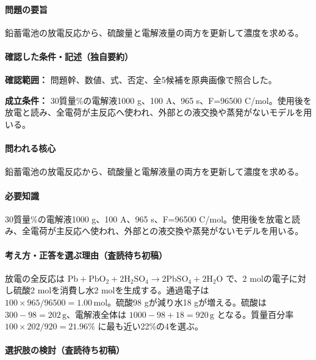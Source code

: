 \paragraph{問題の要旨} 鉛蓄電池の放電反応から、硫酸量と電解液量の両方を更新して濃度を求める。

\paragraph{確認した条件・記述（独自要約）}\mbox{}\par

\noindent\textbf{確認範囲：} 問題幹、数値、式、否定、全5候補を原典画像で照合した。\par

\noindent\textbf{成立条件：} 30質量\%の電解液1000 g、100 A、965 s、F=\allowbreak{}96500 C/mol。使用後を放電と読み、全電荷が主反応へ使われ、外部との液交換や蒸発がないモデルを用いる。\par

\paragraph{問われる核心} 鉛蓄電池の放電反応から、硫酸量と電解液量の両方を更新して濃度を求める。

\paragraph{必要知識} 30質量\%の電解液1000 g、100 A、965 s、F=\allowbreak{}96500 C/mol。使用後を放電と読み、全電荷が主反応へ使われ、外部との液交換や蒸発がないモデルを用いる。

\paragraph{考え方・正答を選ぶ理由（査読待ち初稿）} 放電の全反応は \(\mathrm{Pb+PbO_2+2H_2SO_4\to2PbSO_4+2H_2O}\) で、2 molの電子に対し硫酸2 molを消費し水2 molを生成する。通過電子は \(100\times965/96500=1.00\,\mathrm{mol}\)。硫酸98 gが減り水18 gが増える。硫酸は \(300-98=202\,\mathrm g\)、電解液全体は \(1000-98+18=920\,\mathrm g\) となる。質量百分率 \(100\times202/920=21.96\%\) に最も近い22\%の4を選ぶ。

\paragraph{選択肢の検討（査読待ち初稿）}\mbox{}\par

